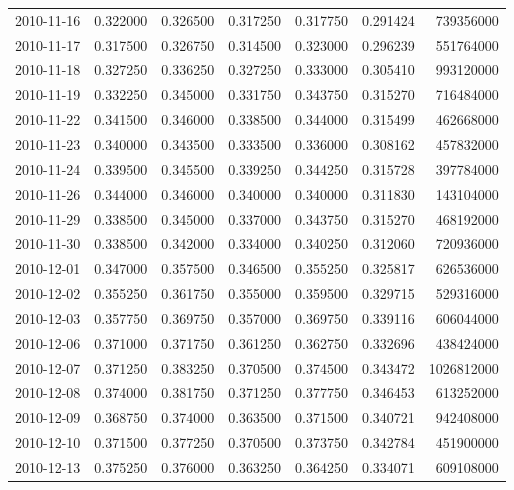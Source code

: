 \begin{tabular}{lrrrrrr}
2010-11-16 &    0.322000 &    0.326500 &    0.317250 &    0.317750 &    0.291424 &   739356000 \\
2010-11-17 &    0.317500 &    0.326750 &    0.314500 &    0.323000 &    0.296239 &   551764000 \\
2010-11-18 &    0.327250 &    0.336250 &    0.327250 &    0.333000 &    0.305410 &   993120000 \\
2010-11-19 &    0.332250 &    0.345000 &    0.331750 &    0.343750 &    0.315270 &   716484000 \\
2010-11-22 &    0.341500 &    0.346000 &    0.338500 &    0.344000 &    0.315499 &   462668000 \\
2010-11-23 &    0.340000 &    0.343500 &    0.333500 &    0.336000 &    0.308162 &   457832000 \\
2010-11-24 &    0.339500 &    0.345500 &    0.339250 &    0.344250 &    0.315728 &   397784000 \\
2010-11-26 &    0.344000 &    0.346000 &    0.340000 &    0.340000 &    0.311830 &   143104000 \\
2010-11-29 &    0.338500 &    0.345000 &    0.337000 &    0.343750 &    0.315270 &   468192000 \\
2010-11-30 &    0.338500 &    0.342000 &    0.334000 &    0.340250 &    0.312060 &   720936000 \\
2010-12-01 &    0.347000 &    0.357500 &    0.346500 &    0.355250 &    0.325817 &   626536000 \\
2010-12-02 &    0.355250 &    0.361750 &    0.355000 &    0.359500 &    0.329715 &   529316000 \\
2010-12-03 &    0.357750 &    0.369750 &    0.357000 &    0.369750 &    0.339116 &   606044000 \\
2010-12-06 &    0.371000 &    0.371750 &    0.361250 &    0.362750 &    0.332696 &   438424000 \\
2010-12-07 &    0.371250 &    0.383250 &    0.370500 &    0.374500 &    0.343472 &  1026812000 \\
2010-12-08 &    0.374000 &    0.381750 &    0.371250 &    0.377750 &    0.346453 &   613252000 \\
2010-12-09 &    0.368750 &    0.374000 &    0.363500 &    0.371500 &    0.340721 &   942408000 \\
2010-12-10 &    0.371500 &    0.377250 &    0.370500 &    0.373750 &    0.342784 &   451900000 \\
2010-12-13 &    0.375250 &    0.376000 &    0.363250 &    0.364250 &    0.334071 &   609108000 \\

\end{tabular}
